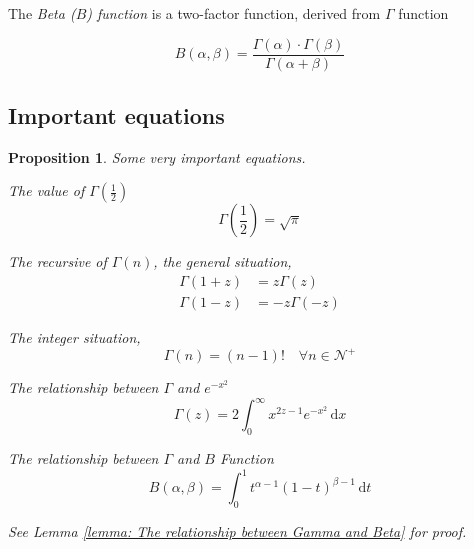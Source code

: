 \documentclass[a4paper]{article}
\newtheorem{proposition}{Proposition}[section]
\begin{document}
The \emph{Beta ($B$) function} is a two-factor function, derived from $\Gamma$ function

\begin{equation}
    B(\alpha, \beta) = \frac{\Gamma(\alpha) \cdot \Gamma(\beta)}{\Gamma(\alpha + \beta)}
\end{equation}

\subsection{Important equations}

\begin{proposition} \label{proposition: Gamma function propositions}
    Some very important equations.

    The value of $\Gamma(\frac{1}{2})$
    \begin{equation*}
        \Gamma(\frac{1}{2}) = \sqrt {\pi}
    \end{equation*}

    The recursive of $\Gamma(n)$, the general situation,
    \begin{equation*}
        \begin{align}
            \Gamma(1+z) & = z \Gamma(z)   \\
            \Gamma(1-z) & = -z \Gamma(-z)
        \end{align}
    \end{equation*}

    The integer situation,
    \begin{equation*}
        \Gamma(n) = (n-1)! \quad \forall n \in \mathcal{N}^+
    \end{equation*}

    The relationship between $\Gamma$ and $e^{-x^{2}}$
    \begin{equation*}
        \Gamma(z) = 2 \int_{0}^{\infty} x^{2z-1} e^{-x^{2}} \,\mathrm{d}x
    \end{equation*}

    The relationship between $\Gamma$ and $B$ Function
    \begin{equation*}
        B(\alpha, \beta) = \int_{0}^{1} t^{\alpha-1} (1-t)^{\beta-1} \,\mathrm{d}t
    \end{equation*}

    See Lemma \ref{lemma: The relationship between Gamma and Beta} for proof.

\end{proposition}

\newpage
\end{document}

